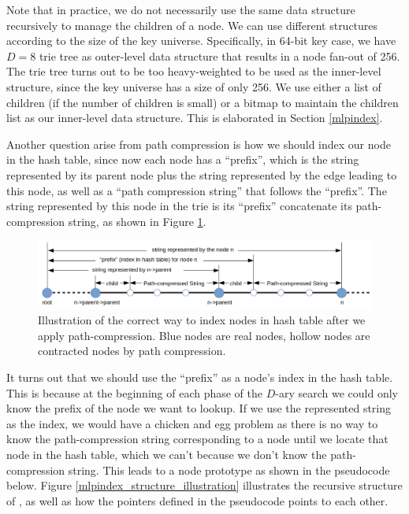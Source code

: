 \documentclass[11pt, usletter]{article}
\begin{document}
Note that in practice, we do not necessarily use the same data structure recursively to manage the children of a node. 
We can use different structures according to the size of the key universe. 
Specifically, in 64-bit key case, we have $D=8$ trie tree as outer-level data structure 
that results in a node fan-out of 256. 
The trie tree turns out to be too heavy-weighted to be used as the inner-level structure, 
since the key universe has a size of only 256.
We use either a list of children (if the number of children is small) 
or a bitmap to maintain the children list as our inner-level data structure. 
This is elaborated in Section \ref{mlpindex}.
 
Another question arise from path compression is how we should index our node in the hash table, 
since now each node has a ``prefix'', which is the string represented by its parent node 
plus the string represented by the edge leading to this node, 
as well as a ``path compression string'' that follows the ``prefix''. 
The string represented by this node in the trie is its ``prefix'' concatenate its path-compression string, 
as shown in Figure \ref{mlpindex_node}.

\begin{figure}[!htb]
  \includegraphics[width=\linewidth]{mlpindex_node.png}
\caption{Illustration of the correct way to index nodes in hash table after we apply path-compression.
Blue nodes are real nodes, hollow nodes are contracted nodes by path compression.}
\label{mlpindex_node}
\end{figure}

It turns out that we should use the ``prefix'' as a node's index 
in the hash table. This is because at the beginning of each phase of the $D$-ary search
we could only know the prefix of the node we want to lookup. 
If we use the represented string as the index, we would have a chicken and egg problem as 
there is no way to know the path-compression string corresponding to a node
until we locate that node in the hash table, which we can't because we don't know the path-compression string. 
This leads to a node prototype as shown in the pseudocode below.
Figure \ref{mlpindex_structure_illustration} illustrates the recursive structure of \MlpIndex, 
as well as how the pointers defined in the pseudocode points to each other.
\end{document}
